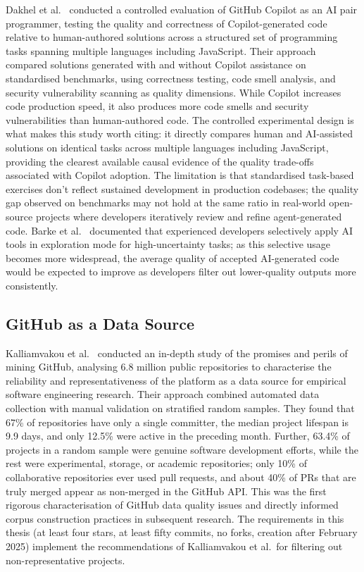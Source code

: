 Dakhel et al.~\cite{dakhel2023} conducted a controlled evaluation of GitHub Copilot
as an AI pair programmer, testing the quality and correctness of Copilot-generated
code relative to human-authored solutions across a structured set of programming
tasks spanning multiple languages including JavaScript. Their approach compared
solutions generated with and without Copilot assistance on standardised benchmarks,
using correctness testing, code smell analysis, and security vulnerability scanning
as quality dimensions. While Copilot increases code production speed, it also
produces more code smells and security vulnerabilities than human-authored code.
The controlled experimental design is what makes this study worth citing: it
directly compares human and AI-assisted solutions on identical tasks across multiple
languages including JavaScript, providing the clearest available causal evidence of
the quality trade-offs associated with Copilot adoption. The limitation is that
standardised task-based exercises don't reflect sustained development in production
codebases; the quality gap observed on benchmarks may not hold at the same ratio in
real-world open-source projects where developers iteratively review and refine
agent-generated code. Barke et al.~\cite{barke2023} documented that experienced
developers selectively apply AI tools in exploration mode for high-uncertainty tasks;
as this selective usage becomes more widespread, the average quality of accepted
AI-generated code would be expected to improve as developers filter out lower-quality
outputs more consistently.

\subsection{GitHub as a Data Source}

Kalliamvakou et al.~\cite{kalliamvakou2016} conducted an in-depth study of the
promises and perils of mining GitHub, analysing 6.8 million public repositories
to characterise the reliability and representativeness of the platform as a data
source for empirical software engineering research. Their approach combined
automated data collection with manual validation on stratified random samples.
They found that 67\% of repositories have only a single committer, the median
project lifespan is 9.9 days, and only 12.5\% were active in the preceding month.
Further, 63.4\% of projects in a random sample were genuine software development
efforts, while the rest were experimental, storage, or academic repositories;
only 10\% of collaborative repositories ever used pull requests, and about 40\%
of PRs that are truly merged appear as non-merged in the GitHub API. This was the
first rigorous characterisation of GitHub data quality issues and directly informed
corpus construction practices in subsequent research. The requirements in this thesis
(at least four stars, at least fifty commits, no forks, creation after February 2025)
implement the recommendations of Kalliamvakou et al.\ for filtering out
non-representative projects.

